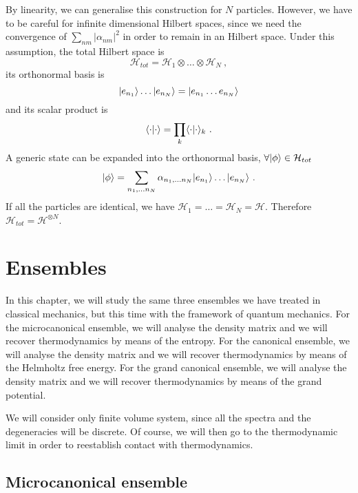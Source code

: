     By linearity, we can generalise this construction for $N$ particles. However, we have to be careful for infinite dimensional Hilbert spaces, since we need the convergence of $\sum_{nm} |\alpha_{nm}|^2$ in order to remain in an Hilbert space. Under this assumption, the total Hilbert space is 
    \begin{equation}\label{comphil}
        \mathcal H_{tot} = \mathcal H_1 \otimes \ldots \otimes \mathcal H_N ~,
    \end{equation}
    its orthonormal basis is 
    \begin{equation*}
        \vert e_{n_1}\rangle \ldots \vert e_{n_N}\rangle = \vert e_{n_1} \ldots e_{n_N}\rangle
    \end{equation*}
    and its scalar product is 
    \begin{equation*}
        \langle\cdot\vert\cdot\rangle = \prod_k \langle\cdot\vert\cdot\rangle_k ~.
    \end{equation*}
    A generic state can be expanded into the orthonormal basis, $\forall \vert\phi\rangle \in \mathcal H_{tot}$ 
    \begin{equation*}
        \vert\phi\rangle = \sum_{n_1, \ldots n_N} \alpha_{n_1, \ldots n_N} \vert e_{n_1}\rangle \ldots \vert e_{n_N}\rangle ~.
    \end{equation*}
    If all the particles are identical, we have $\mathcal H_1 = \ldots = \mathcal H_N = \mathcal H$. Therefore $\mathcal H_{tot} = \mathcal H^{\otimes N}$.

\chapter{Ensembles}

    In this chapter, we will study the same three ensembles we have treated in classical mechanics, but this time with the framework of quantum mechanics. For the microcanonical ensemble, we will analyse the density matrix and we will recover thermodynamics by means of the entropy. For the canonical ensemble, we will analyse the density matrix and we will recover thermodynamics by means of the Helmholtz free energy. For the grand canonical ensemble, we will analyse the density matrix and we will recover thermodynamics by means of the grand potential. 

    We will consider only finite volume system, since all the spectra and the degeneracies will be discrete. Of course, we will then go to the thermodynamic limit in order to reestablish contact with thermodynamics.

\section{Microcanonical ensemble}

